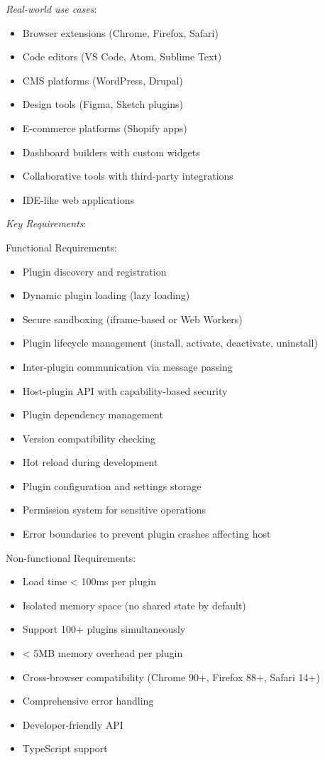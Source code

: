 \documentclass[11pt]{article}
\begin{document}
\emph{Real-world use cases}:

\begin{itemize}
\item Browser extensions (Chrome, Firefox, Safari)
\item Code editors (VS Code, Atom, Sublime Text)
\item CMS platforms (WordPress, Drupal)
\item Design tools (Figma, Sketch plugins)
\item E-commerce platforms (Shopify apps)
\item Dashboard builders with custom widgets
\item Collaborative tools with third-party integrations
\item IDE-like web applications
\end{itemize}

\emph{Key Requirements}:

Functional Requirements:

\begin{itemize}
\item Plugin discovery and registration
\item Dynamic plugin loading (lazy loading)
\item Secure sandboxing (iframe-based or Web Workers)
\item Plugin lifecycle management (install, activate, deactivate, uninstall)
\item Inter-plugin communication via message passing
\item Host-plugin API with capability-based security
\item Plugin dependency management
\item Version compatibility checking
\item Hot reload during development
\item Plugin configuration and settings storage
\item Permission system for sensitive operations
\item Error boundaries to prevent plugin crashes affecting host
\end{itemize}

Non-functional Requirements:

\begin{itemize}
\item Load time < 100ms per plugin
\item Isolated memory space (no shared state by default)
\item Support 100+ plugins simultaneously
\item < 5MB memory overhead per plugin
\item Cross-browser compatibility (Chrome 90+, Firefox 88+, Safari 14+)
\item Comprehensive error handling
\item Developer-friendly API
\item TypeScript support
\end{itemize}
\end{document}
